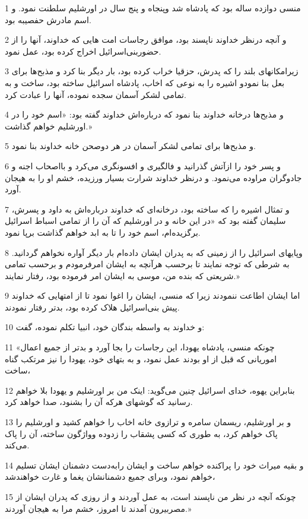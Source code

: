 \par 1 منسی دوازده ساله بود که پادشاه شد وپنجاه و پنج سال در اورشلیم سلطنت نمود. و اسم مادرش حفصیبه بود.
\par 2 و آنچه درنظر خداوند ناپسند بود، موافق رجاسات امت هایی که خداوند، آنها را از حضوربنی‌اسرائیل اخراج کرده بود، عمل نمود.
\par 3 زیرامکانهای بلند را که پدرش، حزقیا خراب کرده بود، بار دیگر بنا کرد و مذبح‌ها برای بعل بنا نمودو اشیره را به نوعی که اخاب، پادشاه اسرائیل ساخته بود، ساخت و به تمامی لشکر آسمان سجده نموده، آنها را عبادت کرد.
\par 4 و مذبح‌ها درخانه خداوند بنا نمود که درباره‌اش خداوند گفته بود: «اسم خود را در اورشلیم خواهم گذاشت.»
\par 5 و مذبح‌ها برای تمامی لشکر آسمان در هر دوصحن خانه خداوند بنا نمود.
\par 6 و پسر خود را ازآتش گذرانید و فالگیری و افسونگری می‌کرد و بااصحاب اجنه و جادوگران مراوده می‌نمود. و درنظر خداوند شرارت بسیار ورزیده، خشم او را به هیجان آورد.
\par 7 و تمثال اشیره را که ساخته بود، درخانه‌ای که خداوند درباره‌اش به داود و پسرش، سلیمان گفته بود که «در این خانه و در اورشلیم که آن را از تمامی اسباط اسرائیل برگزیده‌ام، اسم خود را تا به ابد خواهم گذاشت برپا نمود.
\par 8 وپایهای اسرائیل را از زمینی که به پدران ایشان داده‌ام بار دیگر آواره نخواهم گردانید. به شرطی که توجه نمایند تا بر‌حسب هرآنچه به ایشان امرفرمودم و بر‌حسب تمامی شریعتی که بنده من، موسی به ایشان امر فرموده بود، رفتار نمایند.»
\par 9 اما ایشان اطاعت ننمودند زیرا که منسی، ایشان را اغوا نمود تا از امتهایی که خداوند پیش بنی‌اسرائیل هلاک کرده بود، بدتر رفتار نمودند.
\par 10 و خداوند به واسطه بندگان خود، انبیا تکلم نموده، گفت:
\par 11 «چونکه منسی، پادشاه یهودا، این رجاسات را بجا آورد و بدتر از جمیع اعمال اموریانی که قبل از او بودند عمل نمود، و به بتهای خود، یهودا را نیز مرتکب گناه ساخت،
\par 12 بنابراین یهوه، خدای اسرائیل چنین می‌گوید: اینک من بر اورشلیم و یهودا بلا خواهم رسانید که گوشهای هرکه آن را بشنود، صدا خواهد کرد.
\par 13 و بر اورشلیم، ریسمان سامره و ترازوی خانه اخاب را خواهم کشید و اورشلیم را پاک خواهم کرد، به طوری که کسی پشقاب را زدوده وواژگون ساخته، آن را پاک می‌کند.
\par 14 و بقیه میراث خود را پراکنده خواهم ساخت و ایشان رابه‌دست دشمنان ایشان تسلیم خواهم نمود، وبرای جمیع دشمنانشان یغما و غارت خواهندشد،
\par 15 چونکه آنچه در نظر من ناپسند است، به عمل آوردند و از روزی که پدران ایشان از مصربیرون آمدند تا امروز، خشم مرا به هیجان آوردند.»
